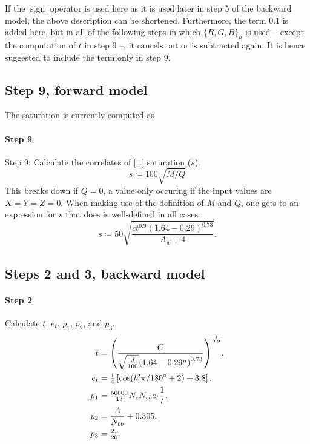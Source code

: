\documentclass[twocolumn]{scrartcl}
\theoremstyle{named}
\DeclareMathOperator{\sign}{sign}
\begin{document}
If the $\sign$ operator is used here as it is used later in step 5 of the
backward model, the above description can be shortened.
Furthermore, the term $0.1$ is added here, but in all of the following steps in
which $\{R,G,B\}_a$ is used -- except the computation of $t$ in step 9 --, it
cancels out or is subtracted again. It is hence suggested to include the term
only in step 9.

\subsection{Step 9, forward model}

The saturation is currently computed as
\paragraph{Step 9}{%
  Step 9: Calculate the correlates of [\dots] saturation ($s$).
  \[
    s \coloneqq 100 \sqrt{M/Q}
  \]
}
This breaks down if $Q=0$, a value only occuring if the input values are
$X=Y=Z=0$. When making use of the definition of $M$ and $Q$, one gets to an
expression for $s$ that does is well-defined in all cases:
\[
  s \coloneqq 50 \sqrt{\frac{c t^{0.9} {(1.64-0.29)}^{0.73}}{A_w + 4}}.
\]


\subsection{Steps 2 and 3, backward model}

\paragraph{Step 2}{Calculate $t$, $e_t$, $p_1$, $p_2$, and $p_3$.
\begin{align*}
  t &= {\left(\frac{C}{\sqrt{\frac{J}{100}} {(1.64 - 0.29^n)}^{0.73}}\right)}^\frac{1}{0.9},\\
  e_t &= \tfrac{1}{4} \left[\cos(h'\pi/180\degree + 2) + 3.8\right],\\
  p_1 &= \tfrac{50000}{13} N_c N_{cb} e_t \frac{1}{t},\\
  p_2 &= \frac{A}{N_{bb}} + 0.305,\\
  p_3 &= \tfrac{21}{20}.
\end{align*}}%
\end{document}
